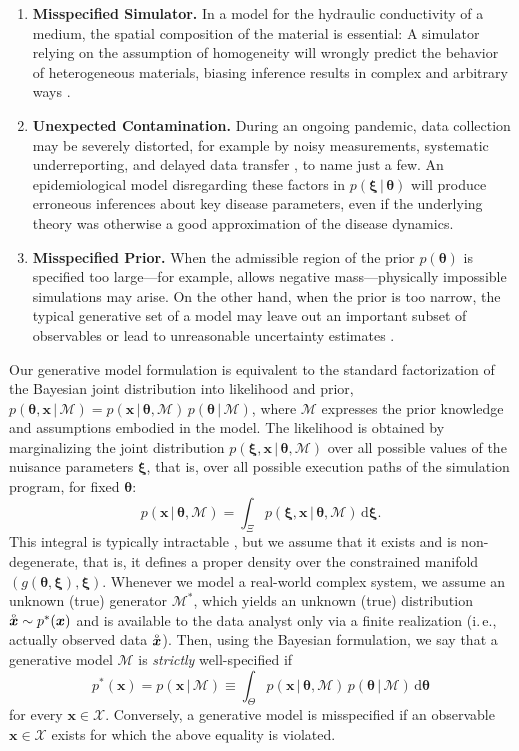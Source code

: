 \documentclass[twoside,11pt]{article}
\newcommand{\observed}[1]{\protect\accentset{\text{o}}{#1}}%
\newcommand{\x}{\boldsymbol{x}}
\newcommand{\xib}{\boldsymbol{\xi}}
\newcommand{\thetab}{\boldsymbol{\theta}}
\newcommand{\0}{\boldsymbol{0}}
\newcommand{\given}{\,|\,}
\newcommand{\priorm}{p(\thetab \given \mathcal{M})}
\newcommand{\likm}{p(\x \given \thetab, \mathcal{M})}
\newcommand{\prior}{p(\thetab)}
\newcommand{\jointm}{p(\thetab, \x \given \mathcal{M})}
\newcommand{\noised}{p(\xib \given \thetab)}
\newcommand{\diff}{\mathrm{d}}
\newcommand{\M}{\mathcal{M}}
\newcommand{\ie}{i.\,e.}
\renewcommand{\cite}[1]{\citep{#1}}
\begin{document}
\begin{enumerate}[label=(\roman*)]
    \item \textbf{Misspecified Simulator.} In a model for the hydraulic conductivity of a medium, the spatial composition of the material is essential: A simulator relying on the assumption of homogeneity will wrongly predict the behavior of heterogeneous materials, biasing inference results in complex and arbitrary ways \citep{Schoniger2015, Nowak2016}.
    \item \textbf{Unexpected Contamination.} During an ongoing pandemic, data collection may be severely distorted, for example by noisy measurements, systematic underreporting, and delayed data transfer \cite{covid_germany}, to name just a few.
    An epidemiological model disregarding these factors in $\noised$ will produce erroneous inferences about key disease parameters, even if the underlying theory was otherwise a good approximation of the disease dynamics.
    \item \textbf{Misspecified Prior.} When the admissible region of the prior $\prior$ is specified too large---for example, allows negative mass---physically impossible simulations may arise.
    On the other hand, when the prior is too narrow, the typical generative set of a model may leave out an important subset of observables or lead to unreasonable uncertainty estimates \citep[e.g., in satellite retrievals;][]{nguyen2019sensitivity}.
\end{enumerate}

Our generative model formulation is equivalent to the standard factorization of the Bayesian joint distribution into likelihood and prior, $\jointm = \likm\,\priorm$, where $\mathcal{M}$ expresses the prior knowledge and assumptions embodied in the model.
The likelihood is obtained by marginalizing the joint distribution $p(\xib, \x \given \thetab, \mathcal{M})$ over all possible values of the nuisance parameters $\xib$, that is, over all possible execution paths of the simulation program, for fixed $\thetab$:
\begin{equation}
    \likm = \int_{\Xi} p(\xib, \x \given \thetab, \mathcal{M})\,\diff \xib.
\end{equation}
This integral is typically intractable \cite{frontier}, but we assume that it exists and is non-degenerate, that is, it defines a proper density over the constrained manifold $\left(g(\thetab, \xib), \xib\right)$.%
Whenever we model a real-world complex system, we assume an unknown (true) generator $\M^*$, which yields an unknown (true) distribution $\observed{\x} \sim p^*(\x)$ and is available to the data analyst only via a finite realization (\ie, actually observed data $\observed{\x}$).
Then, using the Bayesian formulation, we say that a generative model $\mathcal{M}$ is \emph{strictly} well-specified if
\begin{equation}\label{eq:spec}
    p^*(\x) = p(\x \given \mathcal{M}) \equiv \int_{\Theta} \likm\,\priorm\,\diff\thetab 
\end{equation}
for every $\x \in \mathcal{X}$.
Conversely, a generative model is misspecified if an observable $\x \in \mathcal{X}$ exists for which the above equality is violated. 
\end{document}
